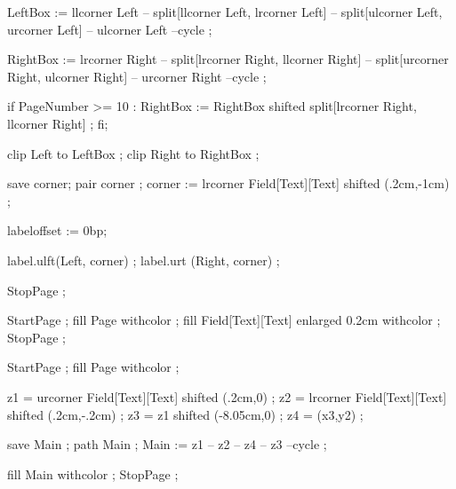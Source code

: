 LeftBox := llcorner Left -- split[llcorner Left, lrcorner Left]
           -- split[ulcorner Left, urcorner Left] -- ulcorner Left --cycle ;
           
RightBox := lrcorner Right -- split[lrcorner Right, llcorner Right]
           -- split[urcorner Right, ulcorner Right] -- urcorner Right --cycle ;

if PageNumber >= 10 :
RightBox := RightBox shifted  split[lrcorner Right, llcorner Right] ;
fi;

clip Left  to LeftBox  ;
clip Right to RightBox ;

save corner; pair corner ;
corner := lrcorner Field[Text][Text] shifted (.2cm,-1cm) ; %

labeloffset := 0bp;

label.ulft(Left,  corner) ;
label.urt (Right, corner) ;

StopPage ;
\stopuseMPgraphic

                       
StartPage ;
fill Page withcolor  ;
fill Field[Text][Text] enlarged 0.2cm
     withcolor  ;
StopPage ;
\stopuniqueMPgraphic 

StartPage ;
fill Page withcolor  ;

z1 = urcorner Field[Text][Text] shifted (.2cm,0) ;
z2 = lrcorner Field[Text][Text] shifted (.2cm,-.2cm) ;
z3 = z1 shifted (-8.05cm,0) ;
z4 = (x3,y2) ;

save Main ;
path Main ;
Main := z1 -- z2 -- z4 -- z3 --cycle ;

fill Main withcolor  ;
StopPage ;
\stopuniqueMPgraphic








\setupSlideTitle
   [\c!after=,
    \c!alternative=layer,
    \c!width=\textwidth,
    \c!height=2.5cm,
    \c!command=\doSlideTitle]



\setupitemize[1][inmargin]

\protect
\stopmodule

\endinput

